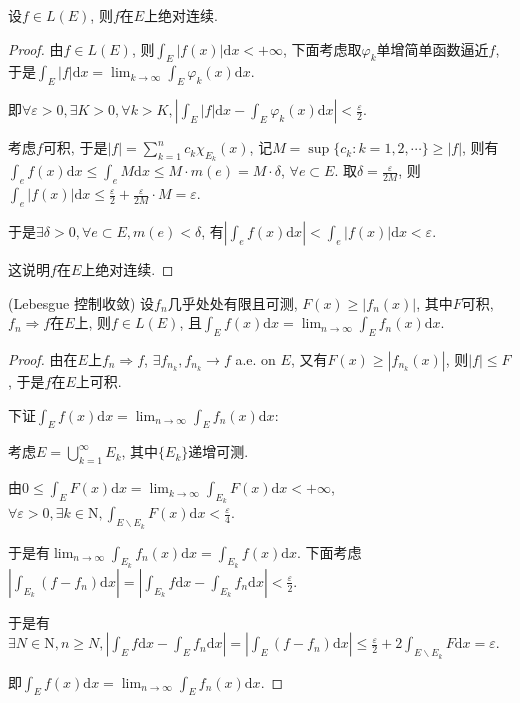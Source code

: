 \documentclass[theorem=false,mathfont=none,openany,sub3section]{easybook}
\begin{document}
\begin{theorem}
  设$f\in L(E)$, 则$f$在$E$上绝对连续.\par
\end{theorem}

\begin{proof}
  由$f\in L(E)$, 则$\int_{E}|f(x)|\mathrm{d}x<+\infty$, 下面考虑取${\varphi_k}$单增简单函数逼近$f$, 于是$\int_{E}|f|\mathrm{d}x=\lim_{k \to \infty}\int_{E}\varphi_k(x)\mathrm{d}x$.\par
  即$\forall \varepsilon >0, \exists K>0, \forall k>K, \left|\int_{E}|f|\mathrm{d}x-\int_{E}\varphi_k(x)\mathrm{d}x\right|<\frac{\varepsilon}{2}$.\par
  考虑$f$可积, 于是$|f|=\sum_{k=1}^{n}c_k\chi_{E_k}(x)$, 记$M=\sup \{c_k:k=1,2,\cdots\}\geqslant |f|$, 则有$\int_{e}f(x)\mathrm{d}x\leqslant \int_{e}M\mathrm{d}x\leqslant M\cdot m(e) = M\cdot \delta$, $\forall e\subset E$.
  取$\delta = \frac{\varepsilon}{2M}$, 则$\int_{e}|f(x)|\mathrm{d}x\leqslant \frac{\varepsilon}{2}+\frac{\varepsilon}{2M}\cdot M=\varepsilon$.\par
  于是$ \exists \delta >0, \forall e\subset E, m(e)<\delta$, 有$\left|\int_{e}f(x)\mathrm{d}x\right|<\int_{e}\left|f(x)\right|\mathrm{d}x<\varepsilon$.\par
  这说明$f$在$E$上绝对连续.\par
\end{proof}

\begin{theorem}
  (Lebesgue 控制收敛) 设$f_n$几乎处处有限且可测, $F(x)\geqslant |f_n(x)|$, 其中$F$可积, $f_n\Rightarrow f$在$E$上, 则$f\in L(E)$, 且$\int_{E}f(x)\mathrm{d}x=\lim_{n\to \infty} \int_{E}f_n(x)\mathrm{d}x$.\par
\end{theorem}

\begin{proof}
  由在$E$上$f_n\Rightarrow f$, $\exists f_{n_k}, f_{n_k}\rightarrow f$ a.e. on $E$, 又有$F(x)\geqslant |f_{n_k}(x)|$, 则$|f|\leqslant F$, 于是$f$在$E$上可积.\par
  下证$\int_{E}f(x)\mathrm{d}x=\lim_{n\to \infty} \int_{E}f_n(x)\mathrm{d}x$:\par
  考虑$E=\bigcup_{k=1}^{\infty}E_k$, 其中$\{E_k\}$递增可测.\par
  由$0\leqslant \int_{E}F(x)\mathrm{d}x=\lim_{k\to \infty}\int_{E_k}F(x)\mathrm{d}x<+\infty$, $\forall \varepsilon >0, \exists k\in \mathrm{N}, \int_{E\backslash E_k}F(x)\mathrm{d}x<\frac{\varepsilon}{4}$.\par
  于是有$\lim_{n\to \infty}\int_{E_k}f_n(x)\mathrm{d}x=\int_{E_k}f(x)\mathrm{d}x$. 下面考虑$\left|\int_{E_k}(f-f_n)\mathrm{d}x\right|=\left|\int_{E_k}f\mathrm{d}x-\int_{E_k}f_n\mathrm{d}x\right|<\frac{\varepsilon}{2}$.\par
  于是有$\exists N\in \mathrm{N}, n\geqslant N, \left|\int_{E}f\mathrm{d}x-\int_{E}f_n\mathrm{d}x\right|=\left|\int_{E}(f-f_n)\mathrm{d}x\right|\leqslant \frac{\varepsilon}{2}+2\int_{E\backslash E_k}F\mathrm{d}x=\varepsilon$.\par
  即$\int_{E}f(x)\mathrm{d}x=\lim_{n\to \infty} \int_{E}f_n(x)\mathrm{d}x$.\par
\end{proof}
\end{document}
